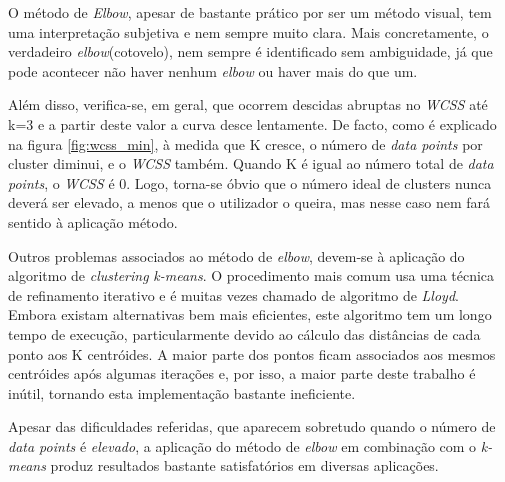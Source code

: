 \documentclass[12pt, a4paper, oneside]{scrreport}
\begin{document}
\indent O método de \textit{Elbow}, apesar de bastante prático por ser um método visual, tem uma interpretação subjetiva e nem sempre muito clara.
Mais concretamente, o verdadeiro \textit{elbow}(cotovelo), nem sempre é identificado sem ambiguidade, já que pode acontecer não haver nenhum \textit{elbow} ou haver mais do que um. 
\par Além disso, verifica-se, em geral, que ocorrem descidas abruptas no \textit{WCSS} até k=3 e a partir deste valor a curva desce lentamente. De facto, como é explicado na figura \ref{fig:wcss_min}, à medida que K cresce, o número de \textit{data points} por cluster diminui, e o \textit{WCSS} também. Quando K é igual ao número total de \textit{data points}, o \textit{WCSS} é 0. Logo, torna-se óbvio que o número ideal de clusters nunca deverá ser elevado, a menos que o utilizador o queira, mas nesse caso nem fará sentido à aplicação método.
\par Outros problemas associados ao método de \textit{elbow}, devem-se à aplicação do algoritmo de \textit{clustering} \textit{k-means}. O procedimento mais comum usa uma técnica de refinamento iterativo e é muitas vezes chamado de algoritmo de \textit{Lloyd}. Embora existam alternativas bem mais eficientes, este algoritmo tem um longo tempo de execução, particularmente devido ao cálculo das distâncias de cada ponto aos K centróides. A maior parte dos pontos ficam associados aos mesmos centróides após algumas iterações e, por isso, a maior parte deste trabalho é inútil, tornando esta implementação bastante ineficiente. 
\par Apesar das dificuldades referidas, que aparecem sobretudo quando o número de \textit{data points} é \textit{elevado}, a aplicação do método de \textit{elbow} em combinação com o \textit{k-means} produz resultados bastante satisfatórios em diversas aplicações.  
\end{document}
